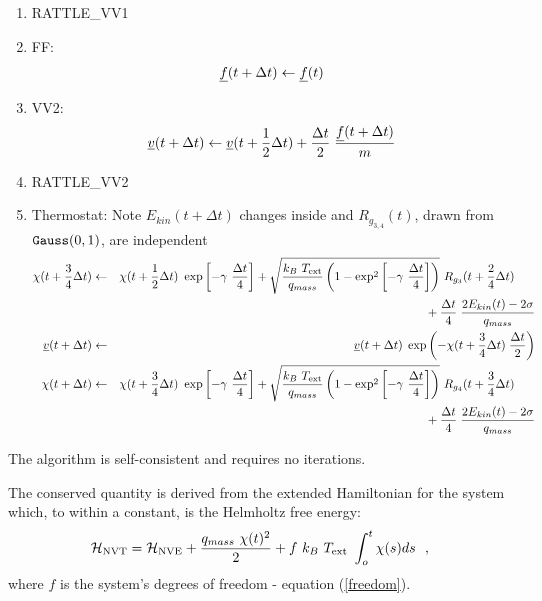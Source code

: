 \begin{enumerate}
\item RATTLE\_VV1
\item FF:
\begin{equation}
\mbox{$\underline{f}$}(t + \Delta t) \leftarrow \mbox{$\underline{f}$}(t)
\end{equation}
\item VV2:
\begin{equation}
\mbox{$\underline{v}$}(t + \Delta t) \leftarrow \mbox{$\underline{v}$}(t + {1 \over 2} \Delta t) +
{\Delta t \over 2} \; {\mbox{$\underline{f}$}(t + \Delta t) \over m}
\end{equation}
\item RATTLE\_VV2
\item Thermostat: Note $E_{kin}(t + \Delta t)$ changes inside and $R_{g_{3,4}}(t)$, drawn from ${\tt Gauss}(0,1)$, are independent
\begin{eqnarray}
\chi (t + {3 \over 4} \Delta t) &\leftarrow& \chi (t + {1 \over 2} \Delta t) ~ \exp \left[-\gamma~{\Delta t \over 4} \right] +
\sqrt{\frac{k_{B}~T_{\rm ext}}{q_{mass}}\left(1-\exp^{2} \left[-\gamma~{\Delta t \over 4} \right]\right)}~R_{g_{3}}(t + {2 \over 4} \Delta t) \phantom{xxx} \nonumber \\
& &\phantom{xxxxxxxxxxxxxxxx} + {\Delta t \over 4} \; {{2 E_{kin}(t) - 2 \sigma} \over q_{mass}} \nonumber \\
\mbox{$\underline{v}$}(t + \Delta t) &\leftarrow& \mbox{$\underline{v}$}(t + \Delta t) \; \exp \left(
-\chi (t + {3 \over 4} \Delta t) \; {\Delta t \over 2} \right) \\
\chi (t + \Delta t) &\leftarrow& \chi (t + {3 \over 4} \Delta t) ~ \exp \left[-\gamma~{\Delta t \over 4} \right] +
\sqrt{\frac{k_{B}~T_{\rm ext}}{q_{mass}}\left(1-\exp^{2} \left[-\gamma~{\Delta t \over 4} \right]\right)}~R_{g_{4}}(t + {3 \over 4} \Delta t) \phantom{xxx} \nonumber \\
& &\phantom{xxxxxxxxxxxxxxxx} + {\Delta t \over 4} \; {{2 E_{kin}(t) - 2 \sigma} \over q_{mass}} \nonumber
\end{eqnarray}
\end{enumerate}
The algorithm is self-consistent and requires no iterations.

The conserved quantity is derived from the extended Hamiltonian for
the system which, to within a constant, is the Helmholtz free
energy:
\begin{equation}
{\cal H}_{\rm NVT} = {\cal H}_{\rm NVE} + {q_{mass}~\chi (t)^{2} \over 2} +
f~k_{B}~T_{\rm ext}~\int_o^t \chi (s) ds~~,
\end{equation}
where $f$ is the system's degrees of freedom - equation
(\ref{freedom}).


